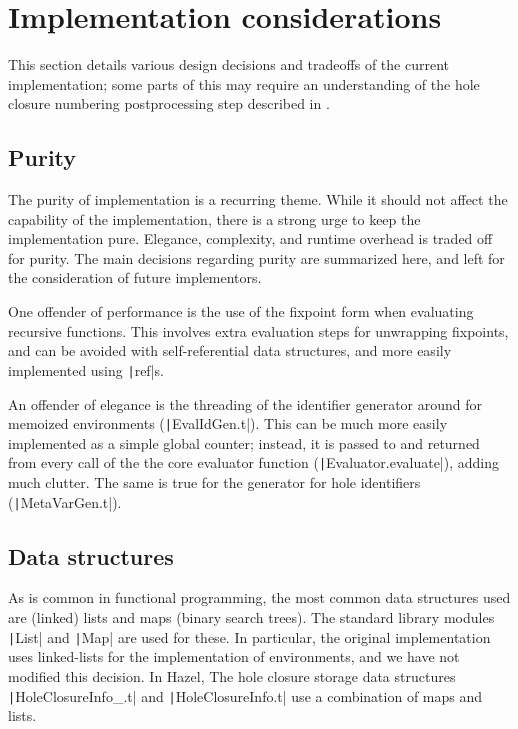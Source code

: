 \section{Implementation considerations}
\label{sec:evalenv_impl_considerations}

This section details various design decisions and tradeoffs of the current implementation; some parts of this may require an understanding of the hole closure numbering postprocessing step described in .

\subsection{Purity}
\label{sec:env-purity}
The purity of implementation is a recurring theme. While it should not affect the capability of the implementation, there is a strong urge to keep the implementation pure. Elegance, complexity, and runtime overhead is traded off for purity. The main decisions regarding purity are summarized here, and left for the consideration of future implementors.

One offender of performance is the use of the fixpoint form when evaluating recursive functions. This involves extra evaluation steps for unwrapping fixpoints, and can be avoided with self-referential data structures, and more easily implemented using \texttt|ref|s.

An offender of elegance is the threading of the identifier generator around for memoized environments (\texttt|EvalIdGen.t|). This can be much more easily implemented as a simple global counter; instead, it is passed to and returned from every call of the the core evaluator function (\texttt|Evaluator.evaluate|), adding much clutter. The same is true for the generator for hole identifiers (\texttt|MetaVarGen.t|).

\subsection{Data structures}
\label{sec:data-structures}

As is common in functional programming, the most common data structures used are (linked) lists and maps (binary search trees). The standard library modules \texttt|List| and \texttt|Map| are used for these. In particular, the original implementation uses linked-lists for the implementation of environments, and we have not modified this decision. In Hazel, The hole closure storage data structures \texttt|HoleClosureInfo_.t| and \texttt|HoleClosureInfo.t| use a combination of maps and lists.

